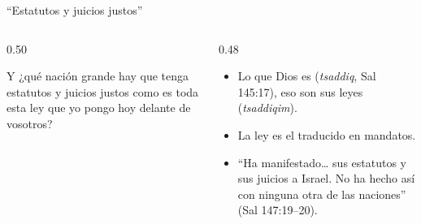 \begin{frame}{``Estatutos y juicios justos''}
\begin{columns}[c,onlytextwidth]
\begin{column}{0.50\textwidth}
\begin{cita}Y ¿qué nación grande hay que tenga estatutos y juicios justos como es toda esta ley que yo pongo hoy delante de vosotros?\end{cita}
\begin{center}\small{}\end{center}
\end{column}
\begin{column}{0.48\textwidth}\small
\begin{itemize}
\item Lo que Dios es (\emph{tsaddiq}, Sal 145:17), eso son sus leyes (\emph{tsaddiqim}).
\item La ley es el  traducido en mandatos.
\item ``Ha manifestado\ldots{} sus estatutos y sus juicios a Israel. No ha hecho así con ninguna otra de las naciones'' (Sal 147:19--20).
\end{itemize}
\end{column}
\end{columns}
\end{frame}

